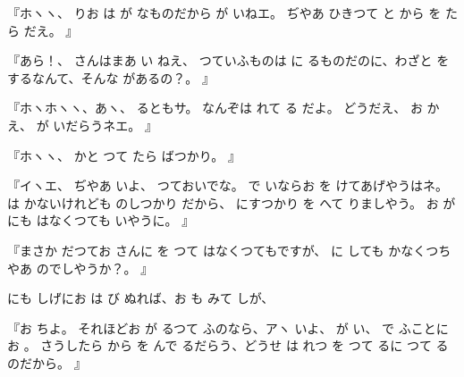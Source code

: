 『ホヽヽ、
りお
は
が
なものだから
が
いねエ。
ぢやあ
ひきつて
と
から
を
たら
だえ。
』

『あら！、
さんはまあ
い
ねえ、
つていふものは
に
るものだのに、わざと
をするなんて、そんな
があるの？。
』

『ホヽホヽヽ、あヽ、
るともサ。
なんぞは
れて
る
だよ。
どうだえ、
お
かえ、
が
いだらうネエ。
』

『ホヽヽ、
かと
つて
たら
ばつかり。
』

『イヽエ、
ぢやあ
いよ、
つておいでな。
で
いならお
を
けてあげやうはネ。
は
かないけれども
のしつかり
だから、
にすつかり
を
へて
りましやう。
お
が
にも
はなくつても
いやうに。
』

『まさか
だつてお
さんに
を
つて
はなくつてもですが、
に
しても
かなくつちやあ
のでしやうか？。
』

にも
しげにお
は
び
ぬれば、お
も
みて
しが、

『お
ちよ。
それほどお
が
るつて
ふのなら、アヽ
いよ、
が
い、
で
ふことにお
。
さうしたら
から
を
んで
るだらう、どうせ
は
れつ
を
つて
るに
つて
るのだから。
』

